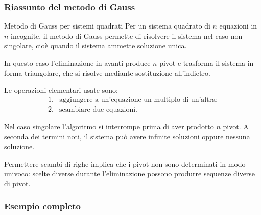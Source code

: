 \documentclass[a4paper]{article}
\begin{document}
\subsubsection{Riassunto del metodo di Gauss}

\begin{snippetproposition}{Metodo di Gauss per sistemi quadrati}
    Per un sistema quadrato di \(n\) equazioni in \(n\) incognite, il metodo di Gauss permette di risolvere il sistema nel caso non singolare, cioè quando il sistema ammette soluzione unica.

    In questo caso l'eliminazione in avanti produce \(n\) pivot e trasforma il sistema in forma triangolare, che si risolve mediante sostituzione all'indietro.
\end{snippetproposition}

Le operazioni elementari usate sono:
\[
    \begin{array}{ll}
        \text{1.} & \text{aggiungere a un'equazione un multiplo di un'altra;}\\
        \text{2.} & \text{scambiare due equazioni.}
    \end{array}
\]

Nel caso singolare l'algoritmo si interrompe prima di aver prodotto \(n\) pivot. A seconda dei termini noti, il sistema può avere infinite soluzioni oppure nessuna soluzione.

\begin{snippetremark}{}
    Permettere scambi di righe implica che i pivot non sono determinati in modo univoco: scelte diverse durante l'eliminazione possono produrre sequenze diverse di pivot.
\end{snippetremark}

\subsubsection{Esempio completo}
\end{document}

